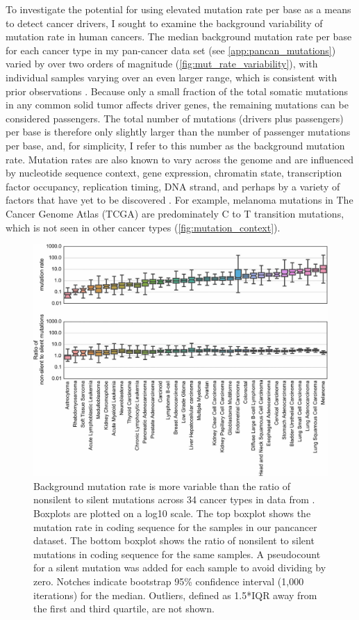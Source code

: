 To investigate the potential for using elevated mutation rate per base as a means to detect cancer drivers, I sought to examine the background variability of mutation rate in human cancers. The median background mutation rate per base for each cancer type in my pan-cancer data set (see \autoref{app:pancan_mutations}) \cite{RN70} varied by over two orders of magnitude (\autoref{fig:mut_rate_variability}), with individual samples varying over an even larger range, which is consistent with prior observations \cite{RN13, RN51}. Because only a small fraction of the total somatic mutations in any common solid tumor affects driver genes, the remaining mutations can be considered passengers. The total number of mutations (drivers plus passengers) per base is therefore only slightly larger than the number of passenger mutations per base, and, for simplicity, I refer to this number as the background mutation rate. Mutation rates are also known to vary across the genome \cite{RN13} and are influenced by nucleotide sequence context, gene expression, chromatin state, transcription factor occupancy, replication timing, DNA strand, and perhaps by a variety of factors that have yet to be discovered \cite{RN72, RN73, RN51, RN74}. For example, melanoma mutations in The Cancer Genome Atlas (TCGA) are predominately C to T transition mutations, which is not seen in other cancer types (\autoref{fig:mutation_context}).

\begin{figure}
  \centering
  \makeatletter
  \let\@currsize\normalsize
  \includegraphics[width=0.9\linewidth]{figures/chapter2/mut_rate_and_ratiometric.jpg}
  \caption[Background mutation rate variability]{Background mutation rate is more variable than the ratio of nonsilent to silent mutations across 34 cancer types in data from \cite{RN14, RN71}. Boxplots are plotted on a log10 scale. The top boxplot shows the mutation rate in coding sequence for the samples in our pancancer dataset. The bottom boxplot shows the ratio of nonsilent to silent mutations in coding sequence for the same samples. A pseudocount for a silent mutation was added for each sample to avoid dividing by zero. Notches indicate bootstrap 95\% confidence interval (1,000 iterations) for the median. Outliers, defined as 1.5*IQR away from the first and third quartile, are not shown.}
  \label{fig:mut_rate_variability}
\end{figure}

